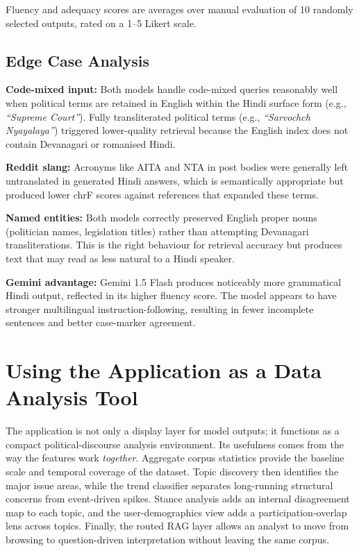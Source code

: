 \documentclass[11pt,a4paper]{article}
\begin{document}
Fluency and adequacy scores are averages over manual evaluation of 10 randomly selected outputs, rated on a 1--5 Likert scale.

\subsection{Edge Case Analysis}

\textbf{Code-mixed input:} Both models handle code-mixed queries reasonably well when political terms are retained in English within the Hindi surface form (e.g., \textit{``Supreme Court''}). Fully transliterated political terms (e.g., \textit{``Sarvochch Nyayalaya''}) triggered lower-quality retrieval because the English index does not contain Devanagari or romanised Hindi.

\textbf{Reddit slang:} Acronyms like AITA and NTA in post bodies were generally left untranslated in generated Hindi answers, which is semantically appropriate but produced lower chrF scores against references that expanded these terms.

\textbf{Named entities:} Both models correctly preserved English proper nouns (politician names, legislation titles) rather than attempting Devanagari transliterations. This is the right behaviour for retrieval accuracy but produces text that may read as less natural to a Hindi speaker.

\textbf{Gemini advantage:} Gemini 1.5 Flash produces noticeably more grammatical Hindi output, reflected in its higher fluency score. The model appears to have stronger multilingual instruction-following, resulting in fewer incomplete sentences and better case-marker agreement.

\section{Using the Application as a Data Analysis Tool}

The application is not only a display layer for model outputs; it functions as a compact political-discourse analysis environment. Its usefulness comes from the way the features work \textit{together}. Aggregate corpus statistics provide the baseline scale and temporal coverage of the dataset. Topic discovery then identifies the major issue areas, while the trend classifier separates long-running structural concerns from event-driven spikes. Stance analysis adds an internal disagreement map to each topic, and the user-demographics view adds a participation-overlap lens across topics. Finally, the routed RAG layer allows an analyst to move from browsing to question-driven interpretation without leaving the same corpus.
\end{document}
